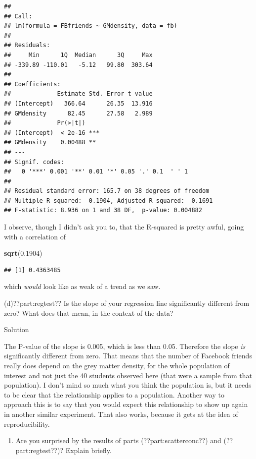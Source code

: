 \documentclass[]{tufte-book}
\newenvironment{Shaded}{}{}
\newcommand{\FloatTok}[1]{\textcolor[rgb]{0.25,0.63,0.44}{#1}}
\newcommand{\KeywordTok}[1]{\textcolor[rgb]{0.00,0.44,0.13}{\textbf{#1}}}
\newcommand{\NormalTok}[1]{#1}
\providecommand{\tightlist}{%
  \setlength{\itemsep}{0pt}\setlength{\parskip}{0pt}}
\theoremstyle{definition}
\theoremstyle{definition}
\theoremstyle{definition}
\theoremstyle{remark}
\begin{document}
\begin{verbatim}
## 
## Call:
## lm(formula = FBfriends ~ GMdensity, data = fb)
## 
## Residuals:
##     Min      1Q  Median      3Q     Max 
## -339.89 -110.01   -5.12   99.80  303.64 
## 
## Coefficients:
##             Estimate Std. Error t value
## (Intercept)   366.64      26.35  13.916
## GMdensity      82.45      27.58   2.989
##             Pr(>|t|)    
## (Intercept)  < 2e-16 ***
## GMdensity    0.00488 ** 
## ---
## Signif. codes:  
##   0 '***' 0.001 '**' 0.01 '*' 0.05 '.' 0.1  ' ' 1
## 
## Residual standard error: 165.7 on 38 degrees of freedom
## Multiple R-squared:  0.1904, Adjusted R-squared:  0.1691 
## F-statistic: 8.936 on 1 and 38 DF,  p-value: 0.004882
\end{verbatim}

I observe, though I didn't ask you to, that the R-squared is pretty
awful, going with a correlation of

\begin{Shaded}
\begin{Highlighting}[]
\KeywordTok{sqrt}\NormalTok{(}\FloatTok{0.1904}\NormalTok{)}
\end{Highlighting}
\end{Shaded}

\begin{verbatim}
## [1] 0.4363485
\end{verbatim}

which \emph{would} look like as weak of a trend as we saw.

(d)??part:regtest?? Is the slope of your regression line significantly
different from zero? What does that mean, in the context of the data?

Solution

The P-value of the slope is 0.005, which is less than 0.05. Therefore
the slope \emph{is} significantly different from zero. That means that
the number of Facebook friends really does depend on the grey matter
density, for the whole population of interest and not just the 40
students observed here (that were a sample from that population). I
don't mind so much what you think the population is, but it needs to be
clear that the relationship applies to a population. Another way to
approach this is to say that you would expect this relationship to show
up again in another similar experiment. That also works, because it gets
at the idea of reproducibility.

\begin{enumerate}
\def\labelenumi{(\alph{enumi})}
\setcounter{enumi}{4}
\tightlist
\item
  Are you surprised by the results of parts (??part:scatterconc??) and
  (??part:regtest??)? Explain briefly.
\end{enumerate}
\end{document}
